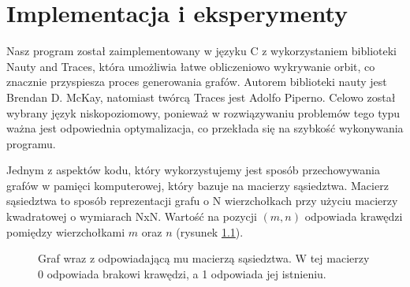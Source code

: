 \chapter{Implementacja i eksperymenty}
Nasz program został zaimplementowany w języku C z wykorzystaniem biblioteki Nauty and Traces\cite{nauty}, która umożliwia łatwe obliczeniowo wykrywanie orbit, co znacznie przyspiesza proces generowania grafów. Autorem biblioteki nauty jest Brendan D. McKay, natomiast twórcą Traces jest Adolfo Piperno. Celowo został wybrany język niskopoziomowy, ponieważ w rozwiązywaniu problemów tego typu ważna jest odpowiednia optymalizacja, co przekłada się na szybkość wykonywania programu.


Jednym z aspektów kodu, który wykorzystujemy jest sposób przechowywania grafów w pamięci komputerowej, który bazuje na macierzy sąsiedztwa. Macierz sąsiedztwa to sposób reprezentacji grafu o N wierzchołkach przy użyciu macierzy kwadratowej o wymiarach NxN. Wartość na pozycji $(m, n)$ odpowiada  krawędzi pomiędzy wierzchołkami $m$ oraz $n$ (rysunek \ref{exmatrix}).
\begin{figure}[H]
  \centering
  \hfill
  \hfill
  \hfill
  \hfill
  \caption{Graf wraz z odpowiadającą mu macierzą sąsiedztwa. W tej macierzy 0 odpowiada brakowi krawędzi, a 1 odpowiada jej istnieniu.}
  \label{exmatrix}
\end{figure}

